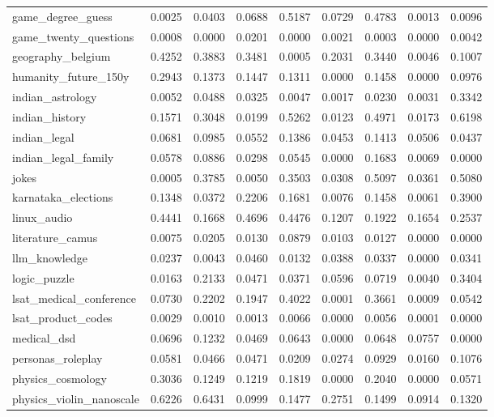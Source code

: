 \begin{landscape}
\begin{longtable}{@{}p{3.8cm}cccccccc@{}}
game\_degree\_guess & 0.0025 & 0.0403 & 0.0688 & 0.5187 & 0.0729 & 0.4783 & 0.0013 & 0.0096 \\
game\_twenty\_questions & 0.0008 & 0.0000 & 0.0201 & 0.0000 & 0.0021 & 0.0003 & 0.0000 & 0.0042 \\
geography\_belgium & 0.4252 & 0.3883 & 0.3481 & 0.0005 & 0.2031 & 0.3440 & 0.0046 & 0.1007 \\
humanity\_future\_150y & 0.2943 & 0.1373 & 0.1447 & 0.1311 & 0.0000 & 0.1458 & 0.0000 & 0.0976 \\
indian\_astrology & 0.0052 & 0.0488 & 0.0325 & 0.0047 & 0.0017 & 0.0230 & 0.0031 & 0.3342 \\
indian\_history & 0.1571 & 0.3048 & 0.0199 & 0.5262 & 0.0123 & 0.4971 & 0.0173 & 0.6198 \\
indian\_legal & 0.0681 & 0.0985 & 0.0552 & 0.1386 & 0.0453 & 0.1413 & 0.0506 & 0.0437 \\
indian\_legal\_family & 0.0578 & 0.0886 & 0.0298 & 0.0545 & 0.0000 & 0.1683 & 0.0069 & 0.0000 \\
jokes & 0.0005 & 0.3785 & 0.0050 & 0.3503 & 0.0308 & 0.5097 & 0.0361 & 0.5080 \\
karnataka\_elections & 0.1348 & 0.0372 & 0.2206 & 0.1681 & 0.0076 & 0.1458 & 0.0061 & 0.3900 \\
linux\_audio & 0.4441 & 0.1668 & 0.4696 & 0.4476 & 0.1207 & 0.1922 & 0.1654 & 0.2537 \\
literature\_camus & 0.0075 & 0.0205 & 0.0130 & 0.0879 & 0.0103 & 0.0127 & 0.0000 & 0.0000 \\
llm\_knowledge & 0.0237 & 0.0043 & 0.0460 & 0.0132 & 0.0388 & 0.0337 & 0.0000 & 0.0341 \\
logic\_puzzle & 0.0163 & 0.2133 & 0.0471 & 0.0371 & 0.0596 & 0.0719 & 0.0040 & 0.3404 \\
lsat\_medical\_conference & 0.0730 & 0.2202 & 0.1947 & 0.4022 & 0.0001 & 0.3661 & 0.0009 & 0.0542 \\
lsat\_product\_codes & 0.0029 & 0.0010 & 0.0013 & 0.0066 & 0.0000 & 0.0056 & 0.0001 & 0.0000 \\
medical\_dsd & 0.0696 & 0.1232 & 0.0469 & 0.0643 & 0.0000 & 0.0648 & 0.0757 & 0.0000 \\
personas\_roleplay & 0.0581 & 0.0466 & 0.0471 & 0.0209 & 0.0274 & 0.0929 & 0.0160 & 0.1076 \\
physics\_cosmology & 0.3036 & 0.1249 & 0.1219 & 0.1819 & 0.0000 & 0.2040 & 0.0000 & 0.0571 \\
physics\_violin\_nanoscale & 0.6226 & 0.6431 & 0.0999 & 0.1477 & 0.2751 & 0.1499 & 0.0914 & 0.1320 \\

\end{longtable}
\end{landscape}
